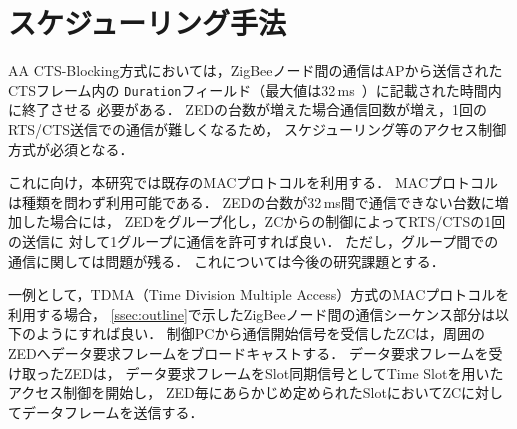 \documentclass[12pt]{jreport}
\begin{document}
\section{スケジューリング手法}
\label{sec:design}

AA CTS-Blocking方式においては，ZigBeeノード間の通信はAPから送信されたCTSフレーム内の
\texttt{Duration}フィールド（最大値は32\,ms~\cite{IEEE802_11-2007}）に記載された時間内に終了させる
必要がある．
ZEDの台数が増えた場合通信回数が増え，1回のRTS/CTS送信での通信が難しくなるため，
スケジューリング等のアクセス制御方式が必須となる．

これに向け，本研究では既存のMACプロトコルを利用する．
MACプロトコルは種類を問わず利用可能である．
ZEDの台数が32\,ms間で通信できない台数に増加した場合には，
ZEDをグループ化し，ZCからの制御によってRTS/CTSの1回の送信に
対して1グループに通信を許可すれば良い．
ただし，グループ間での通信に関しては問題が残る．
これについては今後の研究課題とする．


一例として，TDMA（Time Division Multiple Access）方式のMACプロトコルを利用する場合，
\ref{ssec:outline}で示したZigBeeノード間の通信シーケンス部分は以下のようにすれば良い．
制御PCから通信開始信号を受信したZCは，周囲のZEDへデータ要求フレームをブロードキャストする．
データ要求フレームを受け取ったZEDは，
データ要求フレームをSlot同期信号としてTime Slotを用いたアクセス制御を開始し，
ZED毎にあらかじめ定められたSlotにおいてZCに対してデータフレームを送信する．
\end{document}
